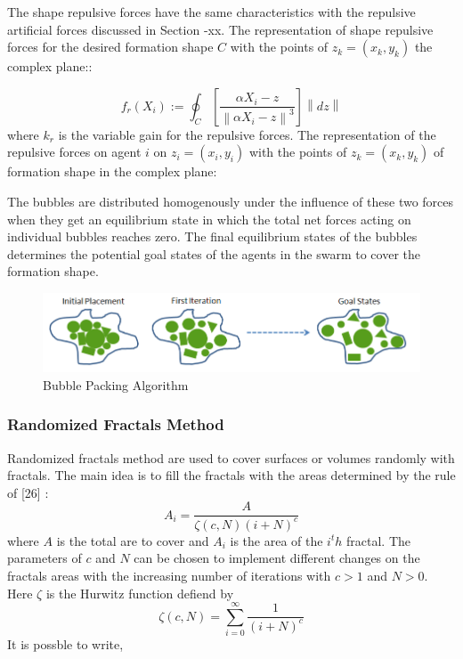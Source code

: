 \documentclass[twoside]{article}
\newcommand{\norm}[1]{\left\lVert#1\right\rVert}
\begin{document}
	
	The shape repulsive forces have the same characteristics with the repulsive artificial forces discussed in Section -xx. The representation of shape repulsive forces for the desired formation shape $C$ with the points of  $z_k = (x_k,y_k)$ the complex plane::
	
		
			\begin{equation}
			f_r(X_i) := \oint_C \left[\frac{\alpha X_i - z}{\norm{\alpha X_i - z}^3}\right] \norm{dz}
			\end{equation}
			where $k_r$ is the variable gain for the repulsive forces. The representation of the repulsive forces on agent $i$ on $z_i = (x_i, y_i)$ with the points of  $z_k = (x_k,y_k)$ of formation shape in the complex plane:
	
	The bubbles are distributed homogenously under the influence of these two forces when they get an equilibrium state in which the total net forces acting on individual bubbles reaches zero. The final equilibrium states of the bubbles determines the potential goal states of the agents in the swarm to cover the formation shape. 
			\begin{figure}[H]
				\caption{Bubble Packing Algorithm}
				\centering
				\includegraphics[scale = 0.70]{bubble_packing2}
			\end{figure}


			\subsubsection{Randomized Fractals Method}
Randomized fractals method are used to cover surfaces or volumes randomly with fractals. The main idea is to fill the fractals with the areas determined by the rule of [26] :
\begin{equation}
  A_i = \frac{A}{\zeta(c,N)(i+N)^c}
\end{equation}
	where $A$ is the total are to cover and $A_i$ is the area of the $i^th$ fractal. The parameters of $c$ and $N$ can be chosen to implement different changes on the fractals areas with the increasing number of iterations with $c>1$ and $N>0$. Here  $\zeta$ is the Hurwitz function defiend by
	\begin{equation}
  \zeta(c,N) = \sum_{i=0}^{\infty} \frac{1}{(i+N)^c}
	\end{equation}
	It is possble to write, 
	
\end{document}
